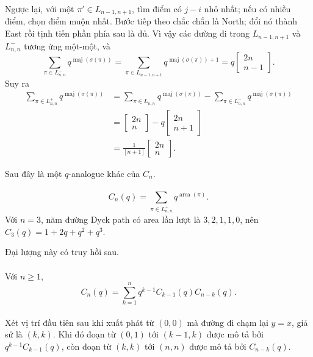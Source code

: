 \documentclass[11pt]{article}
\begin{document}
Ngược lại, với một \(\pi'\in L_{n-1,n+1}\), tìm điểm có \(j-i\) nhỏ nhất; nếu
có nhiều điểm, chọn điểm muộn nhất. Bước tiếp theo chắc chắn là North; đổi nó
thành East rồi tịnh tiến phần phía sau là đủ. Vì vậy các đường đi trong
\(L_{n-1,n+1}\) và \(L^-_{n,n}\) tương ứng một-một, và
\[
  \sum_{\pi\in L^-_{n,n}}q^{\operatorname{maj}(\sigma(\pi))}
  =
  \sum_{\pi\in L_{n-1,n+1}}q^{\operatorname{maj}(\sigma(\pi))+1}
  =
  q\left[\begin{matrix}2n\\ n-1\end{matrix}\right].
\]
Suy ra
\[
\begin{aligned}
  \sum_{\pi\in L^+_{n,n}}q^{\operatorname{maj}(\sigma(\pi))}
  &=
  \sum_{\pi\in L_{n,n}}q^{\operatorname{maj}(\sigma(\pi))}
  -
  \sum_{\pi\in L^-_{n,n}}q^{\operatorname{maj}(\sigma(\pi))}  \\
  &=
  \left[\begin{matrix}2n\\ n\end{matrix}\right]
  -
  q\left[\begin{matrix}2n\\ n+1\end{matrix}\right]  \\
  &=
  \frac{1}{[n+1]}
  \left[\begin{matrix}2n\\ n\end{matrix}\right].
\end{aligned}
\]


Sau đây là một \(q\)-analogue khác của \(C_n\).

\paragraph{}
\[
  C_n(q)=\sum_{\pi\in L^+_{n,n}}q^{\operatorname{area}(\pi)}.
\]
Với \(n=3\), năm đường Dyck path có area lần lượt là
\(3,2,1,1,0\), nên \(C_3(q)=1+2q+q^2+q^3\).


Đại lượng này có truy hồi sau.

\paragraph{}
Với \(n\ge1\),
\[
  C_n(q)=\sum_{k=1}^{n}q^{k-1}C_{k-1}(q)C_{n-k}(q).
\]

\paragraph{}
Xét vị trí đầu tiên sau khi xuất phát từ \((0,0)\) mà đường đi chạm lại
\(y=x\), giả sử là \((k,k)\). Khi đó đoạn từ \((0,1)\) tới \((k-1,k)\) được
mô tả bởi \(q^{k-1}C_{k-1}(q)\), còn đoạn từ \((k,k)\) tới \((n,n)\) được mô
tả bởi \(C_{n-k}(q)\).
\end{document}
